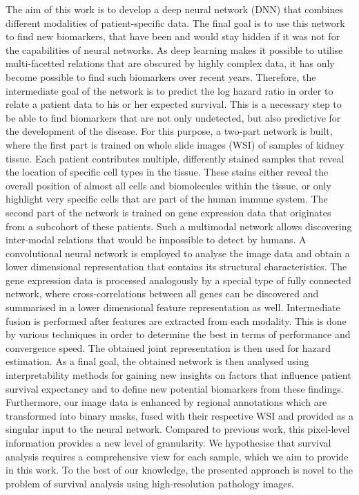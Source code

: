 The aim of this work is to develop a deep neural network (DNN) that combines different modalities of patient-specific data. The final goal is to use this network to find new biomarkers, that have been and would stay hidden if it was not for the capabilities of neural networks. As deep learning makes it possible to utilise multi-facetted relations that are obscured by highly complex data, it has only become possible to find such biomarkers over recent years.
Therefore, the intermediate goal of the network is to predict the log hazard ratio in order to relate a patient data to his or her expected survival. This is a necessary step to be able to find biomarkers that are not only undetected, but also predictive for the development of the disease.
For this purpose, a two-part network is built, where the first part is trained on whole slide images (WSI) of samples of kidney tissue. Each patient contributes multiple, differently stained samples that reveal the location of specific cell types in the tissue. These stains either reveal the overall position of almost all cells and biomolecules within the tissue, or only highlight very specific cells that are part of the human immune system.
The second part of the network is trained on gene expression data that originates from a subcohort of these patients. Such a multimodal network allows discovering inter-modal relations that would be impossible to detect by humans.
A convolutional neural network is employed to analyse the image data and obtain a lower dimensional representation that contains its structural characteristics. The gene expression data is processed analogously by a special type of fully connected network, where cross-correlations between all genes can be discovered and summarised in a lower dimensional feature representation as well. 
Intermediate fusion is performed after features are extracted from each modality. This is done by various techniques in order to determine the best in terms of performance and convergence speed. 
The obtained joint representation is then used for hazard estimation. As a final goal, the obtained network is then analysed using interpretability methods for gaining new insights on factors that influence patient survival expectancy and to define new potential biomarkers from these findings.
Furthermore, our image data is enhanced by regional annotations which are transformed into binary masks, fused with their respective WSI and provided as a singular input to the neural network. Compared to previous work, this pixel-level information provides a new level of granularity. We hypothesise that survival analysis requires a comprehensive view for each sample, which we aim to provide in this work. To the best of our knowledge, the presented approach is novel to the problem of survival analysis using high-resolution pathology images.

